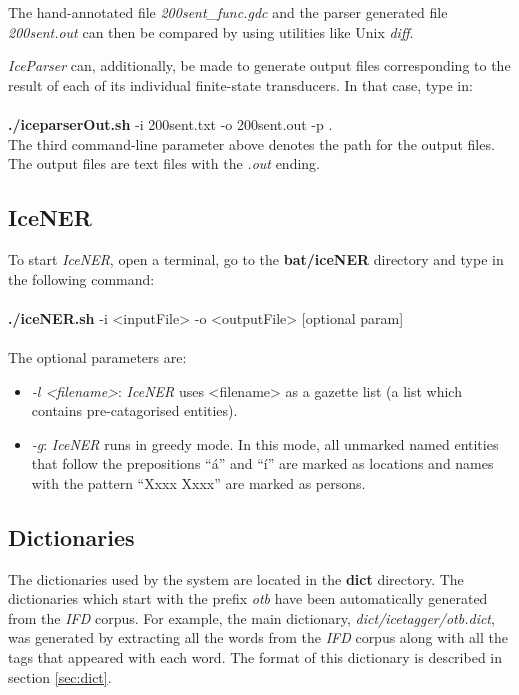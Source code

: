 \documentclass[11pt]{article}
\begin{document}
The hand-annotated file \emph{200sent\_func.gdc} and the parser generated file \emph{200sent.out} can then be compared by using utilities like Unix \emph{diff}.

\emph{IceParser} can, additionally, be made to generate output files corresponding to the result of each of its individual finite-state transducers.
In that case, type in: \\ \\
{\bf ./iceparserOut.sh} -i 200sent.txt -o 200sent.out -p . \\

The third command-line parameter above denotes the path for the output files. The output files are text files with the \emph{.out} ending.

\subsection{IceNER}
To start \emph{IceNER}, open a terminal, go to the \textbf{bat/iceNER} directory and type in the following command:\\ \\
{\bf ./iceNER.sh} -i <inputFile> -o <outputFile> [optional param] \\ \\
The optional parameters are:
\begin{itemize}
\item \emph{-l <filename>}: \emph{IceNER} uses <filename> as a gazette list (a list which contains pre-catagorised entities).
\item \emph{-g}: \emph{IceNER} runs in greedy mode. In this mode, all unmarked named entities that follow the prepositions ``á'' and ``í'' are marked as locations and names with the pattern ``Xxxx Xxxx'' are marked as persons.
\end{itemize}


\subsection{Dictionaries}
The dictionaries used by the system are located in the \textbf{dict} directory.
The dictionaries which start with the prefix \emph{otb} have been automatically generated from the \emph{IFD} corpus.
For example, the main dictionary, \emph{dict/icetagger/otb.dict}, was generated by extracting all the words from the \emph{IFD} corpus along with all the tags that appeared with each word.
The format of this dictionary is described in section \ref{sec:dict}.
\end{document}
